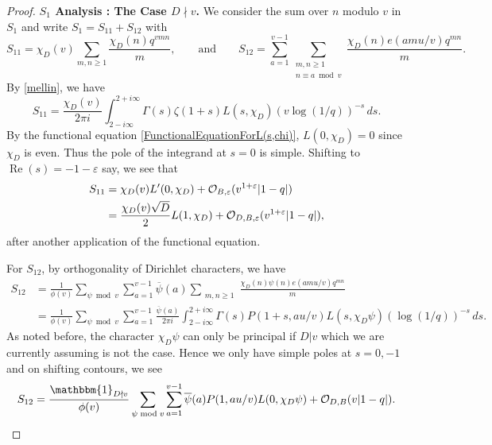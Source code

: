 \documentclass[10pt,a4paper]{amsart}
\newcommand{\mf}{\mathfrak}
\newcommand{\n}{\mf{n}_D}
\newcommand{\ol}{\overline}
\begin{document}
\begin{proof}
\noindent \textbf{$S_1$ Analysis : The Case $D \nmid v$.} We consider the sum over $n$ modulo $v$ in $S_1$ and write $S_1=S_{11}+S_{12}$ with 
\[
S_{11}
=
\chi_D(v)\sum_{m,n\geq 1}\frac{\chi_D(n)q^{vmn}}{m}
,\qquad \textrm{and} \qquad
S_{12}
=
\sum_{a=1}^{v-1}\sum_{\substack{m,n\geq 1\\n\equiv a \bmod v}}\frac{\chi_D(n)e(amu/v)q^{mn}}{m}.
\] 
By \eqref{mellin}, we have
\[
S_{11}
=
\frac{\chi_D(v)}{2\pi i }\int_{2-i\infty}^{2+i\infty}
\Gamma(s)\zeta(1+s)L(s,\chi_D)(v\log(1/q))^{-s}\, ds.
\]
By the functional equation \eqref{FunctionalEquationForL(s,chi)}, $L(0,\chi_D)=0$ since $\chi_D$ is even. Thus the pole of the integrand at $s=0$ is simple. Shifting to $\operatorname{Re}(s)=-1-\varepsilon$ say, we see that
\begin{align}
 S_{11} & = \chi_D(v)L'(0,\chi_D)+\mathcal{O}_{B, \varepsilon}(v^{1+\varepsilon}|1-q|) \notag \\
 &=
  \frac{ \chi_D(v)\sqrt{D}}{2}L(1,\chi_D)+\mathcal{O}_{D,B, \varepsilon}(v^{1+\varepsilon}|1-q|), \label{S11}
 \end{align}
after another application of the functional equation. 



For $S_{12}$, by orthogonality of Dirichlet characters, we have 
\begin{align*}
S_{12}& =
\frac{1}{\phi(v)}\sum_{\psi \bmod v}\sum_{a=1}^{v-1}\ol{\psi}(a)
\sum_{\substack{m,n\geq 1}}\frac{\chi_D(n)\psi(n)e(amu/v)q^{mn}}{m}
\\
& =
\frac{1}{\phi(v)}\sum_{\psi \bmod v}\sum_{a=1}^{v-1} 
\frac{\ol{\psi}(a)}{2\pi i}\int_{2-i\infty}^{2+i\infty}
\Gamma(s)P(1+s,au/v)L(s,\chi_D\psi)(\log(1/q))^{-s}\, ds.
\end{align*}
As noted before, the character $\chi_D\psi$ can only be principal if $D|v$ which we are currently assuming is not the case. Hence we only have simple poles at $s=0,-1$ and on shifting contours,  
we see
\begin{equation}\label{S12}
S_{12}
=
\frac{\mathbbm{1}_{D\nmid v}}{\phi(v)}\sum_{\psi \bmod v}\sum_{a=1}^{v-1} 
{\ol{\psi}(a)}P(1,au/v)L(0,\chi_D\psi)
+ \mathcal{O}_{D,B}(v|1-q|).
\end{equation}




\end{proof}
\end{document}
